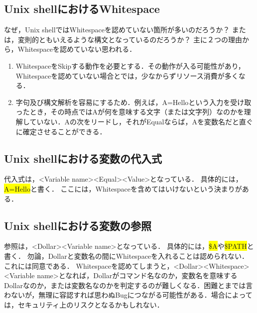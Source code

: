 \documentclass{article}
\begin{document}
\subsection{Unix shellにおけるWhitespace}
なぜ，Unix shellではWhitespaceを認めていない箇所が多いのだろうか？ または，変則的ともいえるような構文となっているのだろうか？\newline
主に２つの理由から，Whitespaceを認めていない思われる．
\begin{enumerate}
    \item WhitespaceをSkipする動作を必要とする．その動作が入る可能性があり，Whitespaceを認めていない場合とでは，少なからずリソース消費が多くなる． 
    \item 字句及び構文解析を容易にするため．例えば，A=Helloという入力を受け取ったとき，その時点ではAが何を意味する文字（または文字列）なのかを理解していない．Aの次をリードし，それがEqualならば，Aを変数名だと直ぐに確定させることができる．
\end{enumerate}

\subsection{Unix shellにおける変数の代入式}
代入式は，\textless Variable name\textgreater\textless Equal\textgreater\textless Value\textgreater となっている．\newline
具体的には， \colorbox{yellow}{A=Hello}と書く．\newline
ここには，Whitespaceを含めてはいけないという決まりがある．

\subsection{Unix shellにおける変数の参照}
参照は，\textless Dollar\textgreater\textless Variable name\textgreater となっている．\newline
具体的には，\colorbox{yellow}{\$A}や\colorbox{yellow}{\$PATH}と書く．\newline
勿論，Dollarと変数名の間にWhitespaceを入れることは認められない．これには同意である．\newline
Whitespaceを認めてしまうと，\textless Dollar\textgreater\textless Whitespace\textgreater\textless Variable name\textgreater となれば，Dollarがコマンド名なのか，変数名を意味するDollarなのか，または変数名なのかを判定するのが難しくなる．困難とまでは言わないが，無理に容認すれば思わぬBugにつながる可能性がある．場合によっては，セキュリティ上のリスクとなるかもしれない．
\end{document}
